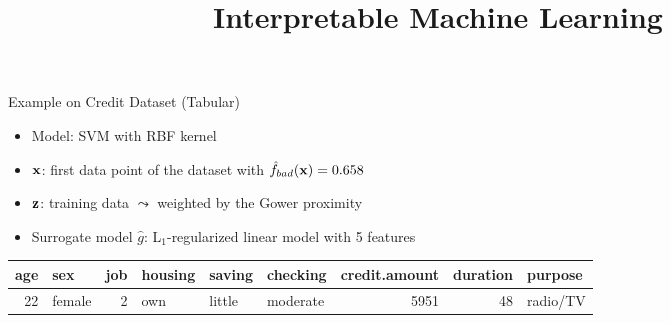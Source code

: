 \documentclass[11pt,compress,t,notes=noshow, aspectratio=169, xcolor=table]{beamer}
\title{Interpretable Machine Learning}
\date{}
\newcommand{\gh}{\hat{g}}
\begin{document}
	




\newcommand{\titlefigure}{figure/lime_credit_ice2.pdf}
\newcommand{\learninggoals}{
    \item See real-world data examples
    \item See application to image and text data}




\begin{frame}[c]{Example on Credit Dataset (Tabular)}
	\begin{itemize}
		\item Model: SVM with RBF kernel
		\item $\mathbf{x}$: first data point of the dataset with $\hat{f}_{bad}(\mathbf{x}) = 0.658$
		\item $\mathbf{z}$: training data $\leadsto$ weighted by the Gower proximity 
		\item Surrogate model $\gh$: L$_1$-regularized linear model with 5 features 
	\end{itemize}

    \bigskip

	\begin{table}[ht]
		\centering
		\scriptsize
		\begin{tabular}{rlrlllrrl}
			\hline
			age & sex & job & housing & saving & checking & credit.amount & duration & purpose \\ 
			\hline
			 22 & female &   2 & own & little & moderate & 5951 &  48 & radio/TV \\ 
			\hline
		\end{tabular}
	\end{table}

\end{frame}
\end{document}
